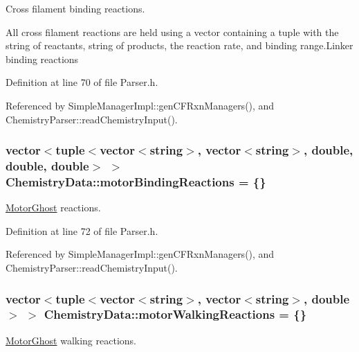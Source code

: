 Cross filament binding reactions. 

All cross filament reactions are held using a vector containing a tuple with the string of reactants, string of products, the reaction rate, and binding range.\+Linker binding reactions 

Definition at line 70 of file Parser.\+h.



Referenced by Simple\+Manager\+Impl\+::gen\+C\+F\+Rxn\+Managers(), and Chemistry\+Parser\+::read\+Chemistry\+Input().

\hypertarget{structChemistryData_a2a4b2e949b6e0b8f32158cf101d24fa6}{
\subsubsection[{motor\+Binding\+Reactions}]{\setlength{\rightskip}{0pt plus 5cm}vector$<$tuple$<$vector$<$string$>$, vector$<$string$>$, double, double, double$>$ $>$ Chemistry\+Data\+::motor\+Binding\+Reactions = \{\}}}\label{structChemistryData_a2a4b2e949b6e0b8f32158cf101d24fa6}


\hyperlink{classMotorGhost}{Motor\+Ghost} reactions. 



Definition at line 72 of file Parser.\+h.



Referenced by Simple\+Manager\+Impl\+::gen\+C\+F\+Rxn\+Managers(), and Chemistry\+Parser\+::read\+Chemistry\+Input().

\hypertarget{structChemistryData_a96d5d5289ae3651ab139b1de586b80e7}{
\subsubsection[{motor\+Walking\+Reactions}]{\setlength{\rightskip}{0pt plus 5cm}vector$<$tuple$<$vector$<$string$>$, vector$<$string$>$, double$>$ $>$ Chemistry\+Data\+::motor\+Walking\+Reactions = \{\}}}\label{structChemistryData_a96d5d5289ae3651ab139b1de586b80e7}


\hyperlink{classMotorGhost}{Motor\+Ghost} walking reactions. 



